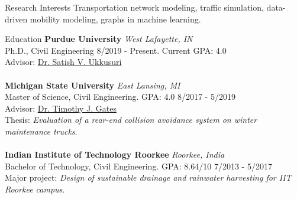 \documentclass{resume} %
\begin{document}
    \begin{rSection}{Research Interests}
        Transportation network modeling, traffic simulation, data-driven mobility modeling, graphs in machine learning.
    \end{rSection}

    \begin{rSection}{Education}
    {\bf Purdue University} \hfill {\em West Lafayette, IN}
    \\ Ph.D., Civil Engineering \hfill {8/2019 - Present}. Current GPA: 4.0
    \\ Advisor: \href{http://www.satishukkusuri.com/}{Dr. Satish V. Ukkusuri} \\
    \\ {\bf Michigan State University} \hfill {\em East Lansing, MI}
    \\ Master of Science, Civil Engineering. GPA: 4.0 \hfill {8/2017 - 5/2019}
    \\ Advisor: \href{https://www.egr.msu.edu/people/profile/gatestim}{Dr. Timothy J. Gates}
    \\ Thesis: \emph{Evaluation of a rear-end collision avoidance system on winter maintenance trucks}. \\
    \\ {\bf Indian Institute of Technology Roorkee} \hfill {\em Roorkee, India}
    \\ Bachelor of Technology, Civil Engineering. GPA: 8.64/10 \hfill {7/2013 - 5/2017}
    \\ Major project: \emph{Design of sustainable drainage and rainwater harvesting for IIT Roorkee campus}.
    \end{rSection}
\end{document}
